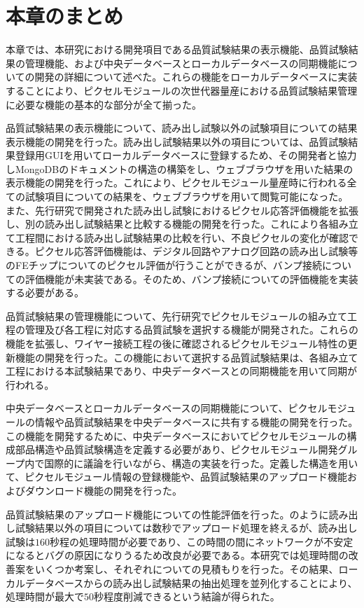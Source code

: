 \section{本章のまとめ}
\label{sec:summary7}

本章では、本研究における開発項目である品質試験結果の表示機能、品質試験結果の管理機能、および中央データベースとローカルデータベースの同期機能についての開発の詳細について述べた。これらの機能をローカルデータベースに実装することにより、ピクセルモジュールの次世代器量産における品質試験結果管理に必要な機能の基本的な部分が全て揃った。

品質試験結果の表示機能について、読み出し試験以外の試験項目についての結果表示機能の開発を行った。読み出し試験結果以外の項目については、品質試験結果登録用GUIを用いてローカルデータベースに登録するため、その開発者と協力しMongoDBのドキュメントの構造の構築をし、ウェブブラウザを用いた結果の表示機能の開発を行った。これにより、ピクセルモジュール量産時に行われる全ての試験項目についての結果を、ウェブブラウザを用いて閲覧可能になった。
また、先行研究で開発された読み出し試験におけるピクセル応答評価機能を拡張し、別の読み出し試験結果と比較する機能の開発を行った。これにより各組み立て工程間における読み出し試験結果の比較を行い、不良ピクセルの変化が確認できる。ピクセル応答評価機能は、デジタル回路やアナログ回路の読み出し試験等のFEチップについてのピクセル評価が行うことができるが、バンプ接続についての評価機能が未実装である。そのため、バンプ接続についての評価機能を実装する必要がある。

品質試験結果の管理機能について、先行研究でピクセルモジュールの組み立て工程の管理及び各工程に対応する品質試験を選択する機能が開発された。これらの機能を拡張し、ワイヤー接続工程の後に確認されるピクセルモジュール特性の更新機能の開発を行った。この機能において選択する品質試験結果は、各組み立て工程における本試験結果であり、中央データベースとの同期機能を用いて同期が行われる。

中央データベースとローカルデータベースの同期機能について、ピクセルモジュールの情報や品質試験結果を中央データベースに共有する機能の開発を行った。この機能を開発するために、中央データベースにおいてピクセルモジュールの構成部品構造や品質試験構造を定義する必要があり、ピクセルモジュール開発グループ内で国際的に議論を行いながら、構造の実装を行った。定義した構造を用いて、ピクセルモジュール情報の登録機能や、品質試験結果のアップロード機能およびダウンロード機能の開発を行った。

品質試験結果のアップロード機能についての性能評価を行った。のように読み出し試験結果以外の項目については数秒でアップロード処理を終えるが、読み出し試験は$160$秒程の処理時間が必要であり、この時間の間にネットワークが不安定になるとバグの原因になりうるため改良が必要である。本研究では処理時間の改善案をいくつか考案し、それぞれについての見積もりを行った。その結果、ローカルデータベースからの読み出し試験結果の抽出処理を並列化することにより、処理時間が最大で$50$秒程度削減できるという結論が得られた。





\newpage
